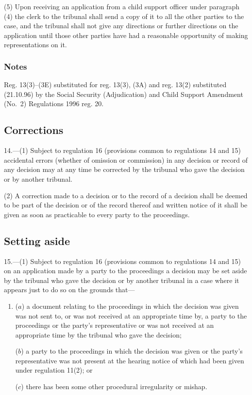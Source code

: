 \documentclass[a4paper]{article}
\newcommand\amendment[1]{\subsubsection*{Notes}{\itshape\frenchspacing\footnotesize #1 \par}}
\begin{document}
(5) Upon receiving an application from a child support officer under paragraph (4) the clerk to the tribunal shall send a copy of it to all the other parties to the case, and the tribunal shall not give any directions or further directions on the application until those other parties have had a reasonable opportunity of making representations on it.

\amendment{

Reg. 13(3)--(3E) substituted for reg. 13(3), (3A) and reg. 13(2) substituted (21.10.96) by the Social Security (Adjudication) and Child Support Amendment (No.\ 2) Regulations 1996 reg. 20.
}

\subsection[14. Corrections]{Corrections}

14.—(1) Subject to regulation 16 (provisions common to regulations 14 and 15) accidental errors (whether of omission or commission) in any decision or record of any decision may at any time be corrected by the tribunal who gave the decision or by another tribunal.

(2) A correction made to a decision or to the record of a decision shall be deemed to be part of the decision or of the record thereof and written notice of it shall be given as soon as practicable to every party to the proceedings.

\subsection[15. Setting aside]{Setting aside}

15.—(1) Subject to regulation 16 (provisions common to regulations 14 and 15) on an application made by a party to the proceedings a decision may be set aside by the tribunal who gave the decision or by another tribunal in a case where it appears just to do so on the grounds that---
\begin{enumerate}\item[]
($a$) a document relating to the proceedings in which the decision was given was not sent to, or was not received at an appropriate time by, a party to the proceedings or the party’s representative or was not received at an appropriate time by the tribunal who gave the decision;

($b$) a party to the proceedings in which the decision was given or the party’s representative was not present at the hearing notice of which had been given under regulation 11(2); or

($c$) there has been some other procedural irregularity or mishap.
\end{enumerate}
\end{document}
